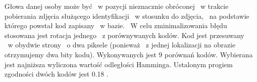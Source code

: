 Głowa danej osoby może być ~w pozycji nieznacznie obróconej ~w trakcie pobierania zdjęcia służącego identyfikacji ~w stosunku do zdjęcia, ~na podstawie  którego powstał kod zapisany  ~w bazie. ~W celu zminimalizowania błędu stosowana jest rotacja jednego ~z porównywanych kodów. Kod jest przesuwany ~w obydwie strony ~o dwa piksele (ponieważ ~z jednej lokalizacji na obrazie otrzymujemy dwa bity kodu). Wykonywanych jest 9 porównań kodów. Wybierana jest najniższa wyliczona wartość odległości Hamminga. Ustalonym progiem zgodności dwóch kodów jest 0.18 \cite{Daugman}.

